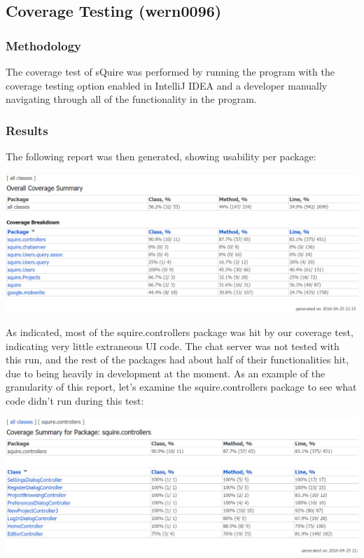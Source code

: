 \documentclass[twoside,letterpaper]{article}
\begin{document}
\clearpage
\subsection{Coverage Testing (wern0096)}

\subsubsection{Methodology}

The coverage test of sQuire was performed by running the program with the coverage testing option enabled in IntelliJ IDEA and a developer manually navigating through all of the functionality in the program.

\subsubsection{Results}

The following report was then generated, showing usability per package:

\noindent\includegraphics[width=\textwidth]{images/TestPlan/CoverageTest}

As indicated, most of the squire.controllers package was hit by our coverage test, indicating very little extraneous UI code. The chat server was not tested with this run, and the rest of the packages had about half of their functionalities hit, due to being heavily in development at the moment. As an example of the granularity of this report, let's examine the squire.controllers package to see what code didn't run during this test: 

\noindent\includegraphics[width=\textwidth]{images/TestPlan/ControllerCoverageTest}
\end{document}
